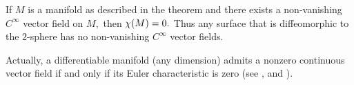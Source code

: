 \documentclass[../main]{subfiles}
\begin{document}
\begin{corollary} \label{thm:ch8.2.3}
If $M$ is a manifold as described in the theorem and there exists a non-vanishing $C^\infty$ vector field on $M,$ then $\chi(M)=0.$ Thus any surface that is diffeomorphic to the $2$-sphere has no non-vanishing $C^\infty$ vector fields.
\end{corollary}



Actually, a differentiable manifold (any dimension) admits a nonzero continuous vector field if and only if its Euler characteristic is zero (see \cite[p. 203]{steenrod1951the}, and \cite[p. 549]{alexandroff1937topologie}). 
\end{document}
